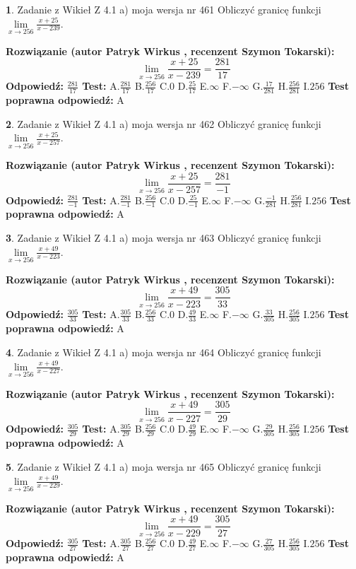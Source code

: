 \documentclass[12pt, a4paper]{article}
\theoremstyle{definition} %
\newtheorem{zad}{}
\newcommand{\zadStart}[1]{\begin{zad}#1\newline}
\newcommand{\zadStop}{\end{zad}}
\newcommand{\rozwStart}[2]{\noindent \textbf{Rozwiązanie (autor #1 , recenzent #2): }\newline}
\newcommand{\rozwStop}{\newline}
\newcommand{\odpStart}{\noindent \textbf{Odpowiedź:}\newline}
\newcommand{\odpStop}{\newline}
\newcommand{\testStart}{\noindent \textbf{Test:}\newline}
\newcommand{\testStop}{\newline}
\newcommand{\kluczStart}{\noindent \textbf{Test poprawna odpowiedź:}\newline}
\newcommand{\kluczStop}{\newline}
\begin{document}
\zadStart{Zadanie z Wikieł Z 4.1 a) moja wersja nr 461}
Obliczyć granicę funkcji $\lim\limits_{x\to256}\frac{x+25}{x-239}$.
\zadStop
\rozwStart{Patryk Wirkus}{Szymon Tokarski}
$$\lim\limits_{x\to256}\frac{x+25}{x-239} = \frac{281}{17}$$
\rozwStop
\odpStart
$\frac{281}{17}$
\odpStop
\testStart
A.$\frac{281}{17}$
B.$\frac{256}{17}$
C.$0$
D.$\frac{25}{17}$
E.$\infty$
F.$-\infty$
G.$\frac{17}{281}$
H.$\frac{256}{281}$
I.$256$
\testStop
\kluczStart
A
\kluczStop



\zadStart{Zadanie z Wikieł Z 4.1 a) moja wersja nr 462}
Obliczyć granicę funkcji $\lim\limits_{x\to256}\frac{x+25}{x-257}$.
\zadStop
\rozwStart{Patryk Wirkus}{Szymon Tokarski}
$$\lim\limits_{x\to256}\frac{x+25}{x-257} = \frac{281}{-1}$$
\rozwStop
\odpStart
$\frac{281}{-1}$
\odpStop
\testStart
A.$\frac{281}{-1}$
B.$\frac{256}{-1}$
C.$0$
D.$\frac{25}{-1}$
E.$\infty$
F.$-\infty$
G.$\frac{-1}{281}$
H.$\frac{256}{281}$
I.$256$
\testStop
\kluczStart
A
\kluczStop



\zadStart{Zadanie z Wikieł Z 4.1 a) moja wersja nr 463}
Obliczyć granicę funkcji $\lim\limits_{x\to256}\frac{x+49}{x-223}$.
\zadStop
\rozwStart{Patryk Wirkus}{Szymon Tokarski}
$$\lim\limits_{x\to256}\frac{x+49}{x-223} = \frac{305}{33}$$
\rozwStop
\odpStart
$\frac{305}{33}$
\odpStop
\testStart
A.$\frac{305}{33}$
B.$\frac{256}{33}$
C.$0$
D.$\frac{49}{33}$
E.$\infty$
F.$-\infty$
G.$\frac{33}{305}$
H.$\frac{256}{305}$
I.$256$
\testStop
\kluczStart
A
\kluczStop



\zadStart{Zadanie z Wikieł Z 4.1 a) moja wersja nr 464}
Obliczyć granicę funkcji $\lim\limits_{x\to256}\frac{x+49}{x-227}$.
\zadStop
\rozwStart{Patryk Wirkus}{Szymon Tokarski}
$$\lim\limits_{x\to256}\frac{x+49}{x-227} = \frac{305}{29}$$
\rozwStop
\odpStart
$\frac{305}{29}$
\odpStop
\testStart
A.$\frac{305}{29}$
B.$\frac{256}{29}$
C.$0$
D.$\frac{49}{29}$
E.$\infty$
F.$-\infty$
G.$\frac{29}{305}$
H.$\frac{256}{305}$
I.$256$
\testStop
\kluczStart
A
\kluczStop



\zadStart{Zadanie z Wikieł Z 4.1 a) moja wersja nr 465}
Obliczyć granicę funkcji $\lim\limits_{x\to256}\frac{x+49}{x-229}$.
\zadStop
\rozwStart{Patryk Wirkus}{Szymon Tokarski}
$$\lim\limits_{x\to256}\frac{x+49}{x-229} = \frac{305}{27}$$
\rozwStop
\odpStart
$\frac{305}{27}$
\odpStop
\testStart
A.$\frac{305}{27}$
B.$\frac{256}{27}$
C.$0$
D.$\frac{49}{27}$
E.$\infty$
F.$-\infty$
G.$\frac{27}{305}$
H.$\frac{256}{305}$
I.$256$
\testStop
\kluczStart
A
\kluczStop
\end{document}

